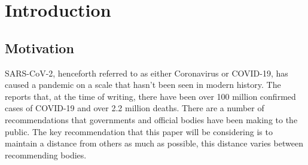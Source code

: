 \documentclass{l4proj}
\begin{document}
\tableofcontents

%
%
%
%
%
%
%
%
\chapter{Introduction}



\section{Motivation}

SARS-CoV-2, henceforth referred to as either Coronavirus or COVID-19, has caused a pandemic on a scale that hasn't been seen in modern history. The \citet{world_health_organisation_dashboard_2021} reports that, at the time of writing, there have been over 100 million confirmed cases of COVID-19 and over 2.2 million deaths. There are a number of recommendations that governments and official bodies have been making to the public. The key recommendation that this paper will be considering is to maintain a distance from others as much as possible, this distance varies between recommending bodies.
\end{document}
